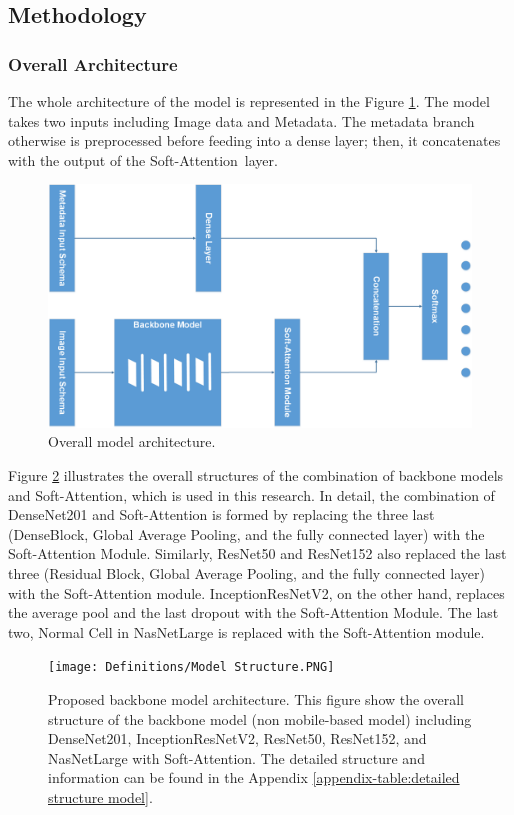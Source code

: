 \documentclass[sensors,article,accept,pdftex,moreauthors]{Definitions/mdpi}
\begin{document}
	\subsection{Methodology}
	\subsubsection{Overall Architecture}
	The whole architecture of the model is represented in the Figure \ref{fig:main-model}. The model takes two inputs including Image data and Metadata. The metadata branch otherwise is preprocessed before feeding into a dense layer; then, it concatenates with the output of the Soft-Attention~layer. 
	
	\begin{figure}[H]
		\includegraphics[width=0.9\linewidth]{Definitions/MainModel - Model Form.PNG}
		\caption{Overall model architecture.}
		\label{fig:main-model}
	\end{figure}
	
	Figure \ref{fig:model-structure} illustrates the overall structures of the combination of backbone models and Soft-Attention, which is used in this research. In detail, the combination of DenseNet201 and Soft-Attention is formed by replacing the three last (DenseBlock, Global Average Pooling, and the fully connected layer) with the Soft-Attention Module. Similarly, ResNet50 and ResNet152 also replaced the last three (Residual Block, Global Average Pooling, and the fully connected layer) with the Soft-Attention module. InceptionResNetV2, on the other hand, replaces the average pool and the last dropout with the Soft-Attention Module. The last two, Normal Cell in NasNetLarge is replaced with the Soft-Attention module. 
	
	\begin{figure}[H]
		\texttt{[image: Definitions/Model  Structure.PNG]}
		\caption{{Proposed} %
 backbone model architecture. This figure show the overall structure of the backbone model (non mobile-based model) including DenseNet201, InceptionResNetV2, ResNet50, ResNet152, and NasNetLarge {with Soft-Attention}. The detailed structure and information can be found in the Appendix \ref{appendix-table:detailed structure model}.}
		\label{fig:model-structure}
	\end{figure}
	
\end{document}
